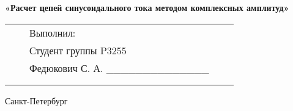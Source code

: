 \documentclass[12pt]{article}
\begin{document}
\begin{center}
		\large
		\par\bigskip
		\textbf{«Расчет цепей синусоидального тока методом комплексных амплитуд»}
		\par\bigskip\par\bigskip\par\bigskip\par\bigskip\par\bigskip\par\bigskip
		\par\bigskip\par\bigskip\par\bigskip\par\bigskip\par\bigskip\par\bigskip
		\par\bigskip\par\bigskip\par\bigskip\par\bigskip\par\bigskip\par\bigskip
		\normalsize
		\begin{tabular}{lllll}
							\hspace{170pt}	 							& \hspace{80pt}	&	Выполнил:								&\\
																	&			&	Студент группы P3255					&\\
																	& 			&	Федюкович С. А. \_\_\_\_\_\_\_\_\_\_\_\_\_\_	&\\
																	&			&										&\\
																	&			&										&\\
		\end{tabular}
		\par\bigskip\par\bigskip\par\bigskip                                                  
		\par\bigskip \par\bigskip
		\par\bigskip\par\bigskip\par\bigskip\par\bigskip\par\bigskip\par\bigskip\par\bigskip\par\bigskip
		
		Санкт-Петербург
		\par{}
	\end{center}
	\newpage
	\pagestyle{plain}
	\setcounter{page}{1}
\end{document}
